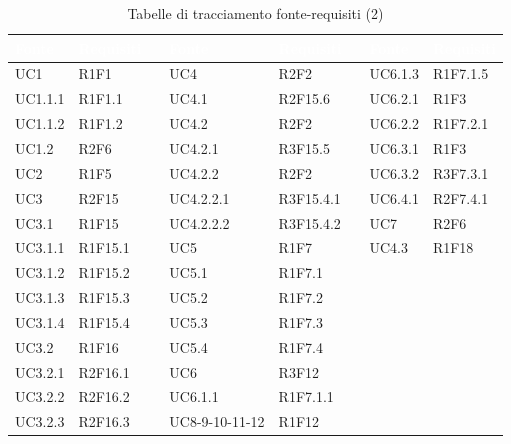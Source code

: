 {
\setlength\arrayrulewidth{1pt}
\begin{longtable}{C{2cm} | C{2cm} C{0.5cm} C{2cm} | C{2cm} C{0.5cm} C{2cm} C{2cm}}
		\textcolor{white}{\textbf{Fonte}} & 
		\textcolor{white}{\textbf{Requisiti}} &
		 &
		\textcolor{white}{\textbf{Fonte}} & 
		\textcolor{white}{\textbf{Requisiti}} &
		 &
		\textcolor{white}{\textbf{Fonte}} & 
		\textcolor{white}{\textbf{Requisiti}} \\
		\endfirsthead
	    
	    \endfoot
	    \caption{Tabelle di tracciamento fonte-requisiti (2)}
	    \endlastfoot


UC1 & R1F1 &  & UC4 & R2F2 &  & UC6.1.3 & R1F7.1.5\\
UC1.1.1 & R1F1.1 &  & UC4.1 & R2F15.6 &  & UC6.2.1 & R1F3\\
UC1.1.2 & R1F1.2 &  & UC4.2 & R2F2 &  & UC6.2.2 & R1F7.2.1\\
UC1.2 & R2F6 &  & UC4.2.1 & R3F15.5 &  & UC6.3.1 & R1F3\\
UC2 & R1F5 &  & UC4.2.2 & R2F2 &   & UC6.3.2 & R3F7.3.1\\
UC3 & R2F15 &  & UC4.2.2.1 & R3F15.4.1 &  & UC6.4.1 & R2F7.4.1\\
UC3.1 & R1F15 &  & UC4.2.2.2 & R3F15.4.2 &  & UC7 & R2F6\\
UC3.1.1 & R1F15.1 &  & UC5 & R1F7 &  & UC4.3 & R1F18\\
UC3.1.2 & R1F15.2 &  & UC5.1 & R1F7.1 &  &  & \\
UC3.1.3 & R1F15.3 &  & UC5.2 & R1F7.2 &  & &\\
UC3.1.4 & R1F15.4 &  & UC5.3 & R1F7.3 &  & &\\
UC3.2 & R1F16 &  & UC5.4 & R1F7.4 &  & &\\
UC3.2.1 & R2F16.1 &  & UC6 & R3F12 &  & &\\
UC3.2.2 & R2F16.2 &  & UC6.1.1 & R1F7.1.1 &  & &\\
UC3.2.3 & R2F16.3 &  & UC8-9-10-11-12 & R1F12 &  & &\\

\end{longtable}
}